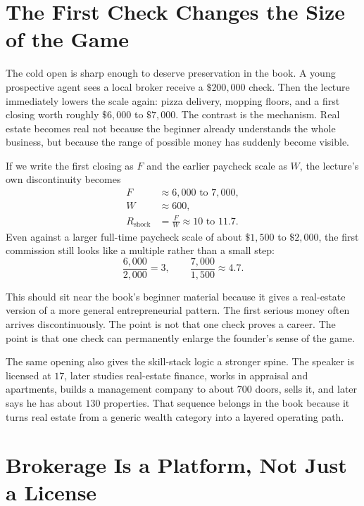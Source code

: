 \documentclass[11pt,oneside]{book}
\begin{document}
\section{The First Check Changes the Size of the Game}

The cold open is sharp enough to deserve preservation in the book. A young prospective agent sees a local broker receive a \(\$200{,}000\) check. Then the lecture immediately lowers the scale again: pizza delivery, mopping floors, and a first closing worth roughly \(\$6{,}000\) to \(\$7{,}000\). The contrast is the mechanism. Real estate becomes real not because the beginner already understands the whole business, but because the range of possible money has suddenly become visible.

If we write the first closing as \(F\) and the earlier paycheck scale as \(W\), the lecture's own discontinuity becomes
\begin{align}
F &\approx 6{,}000 \text{ to } 7{,}000,\\
W &\approx 600,\\
R_{\mathrm{shock}} &= \frac{F}{W} \approx 10 \text{ to } 11.7.
\end{align}
Even against a larger full-time paycheck scale of about \(\$1{,}500\) to \(\$2{,}000\), the first commission still looks like a multiple rather than a small step:
\begin{equation}
\frac{6{,}000}{2{,}000}=3,
\qquad
\frac{7{,}000}{1{,}500}\approx 4.7.
\end{equation}

This should sit near the book's beginner material because it gives a real-estate version of a more general entrepreneurial pattern. The first serious money often arrives discontinuously. The point is not that one check proves a career. The point is that one check can permanently enlarge the founder's sense of the game.

The same opening also gives the skill-stack logic a stronger spine. The speaker is licensed at \(17\), later studies real-estate finance, works in appraisal and apartments, builds a management company to about \(700\) doors, sells it, and later says he has about \(130\) properties. That sequence belongs in the book because it turns real estate from a generic wealth category into a layered operating path.

\section{Brokerage Is a Platform, Not Just a License}
\end{document}
